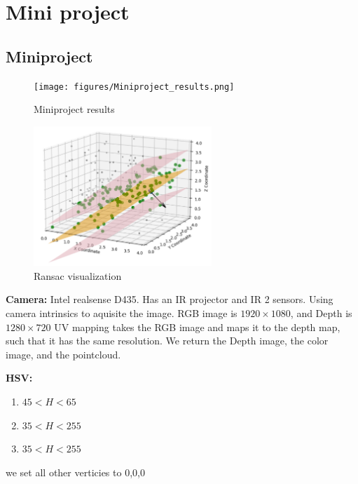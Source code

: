 \documentclass[a4paper]{article}
\begin{document}
\newpage
\centering
\section{Mini project}
\raggedright
\newpage
\subsection{Miniproject}

\begin{figure}[H]
\centering
\texttt{[image: figures/Miniproject\_results.png]}
\caption{Miniproject results}
\label{fig:miniproject_results}
\end{figure} 

\begin{figure}[H]
\centering
\includegraphics[width=0.6\textwidth]{figures/RANSAC_miniproject_visualization.png}
\caption{Ransac visualization}
\label{fig:ransac_mini_viz}
\end{figure} 

\textbf{Camera:} 
Intel realsense D435. Has an IR projector and IR 2 sensors. Using camera intrinsics to aquisite the image.
RGB image is $ 1920 \times 1080 $, and Depth is $ 1280 \times 720 $
UV mapping takes the RGB image and maps it to the depth map, such that it has the same resolution. 
We return the Depth image, the color image, and the pointcloud. 

\textbf{HSV:} 
\begin{enumerate}
	\item $ 45 < H < 65 $
	\item $ 35 < H < 255 $
	\item $ 35 < H < 255 $
\end{enumerate}

we set all other verticies to 0,0,0
\end{document}
